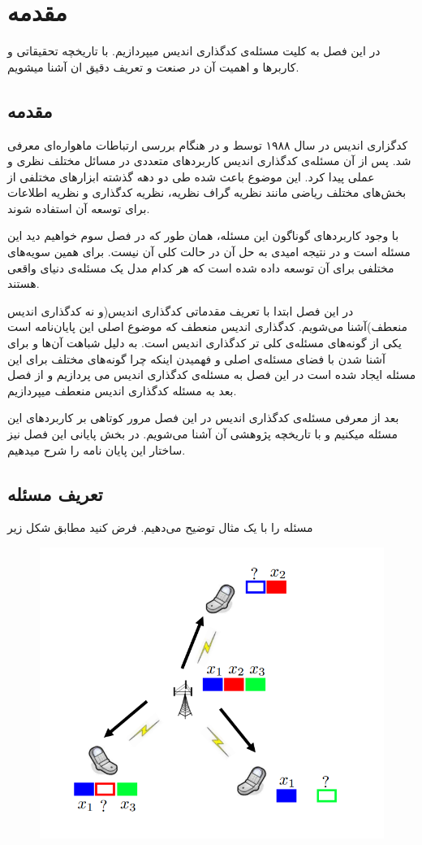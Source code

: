 \chapter{مقدمه}
\label{chapter:introduction}

در این فصل به کلیت مسئله‌ی کدگذاری اندیس میپردازیم. با تاریخچه تحقیقاتی و کاربرها و اهمیت آن در صنعت و تعریف دقیق ان آشنا میشویم.
\pagebreak

\section{مقدمه}
کدگزاری اندیس در سال ۱۹۸۸ توسط 
و
در
\cite{25}
هنگام بررسی ارتباطات ماهواره‌ای معرفی شد.  پس از آن مسئله‌ی کدگذاری اندیس کاربردهای متعددی در مسائل مختلف نظری و عملی پیدا کرد. این موضوع باعث شده طی دو دهه گذشته ابزارهای مختلفی از بخش‌های مختلف ریاضی مانند نظریه گراف نظریه، نظریه کدگذاری و نظریه اطلاعات برای توسعه آن استفاده شوند.

	با وجود کاربردهای گوناگون این مسئله، همان طور که در فصل سوم خواهیم دید این مسئله
است و در نتیجه امیدی به حل آن در حالت کلی آن نیست. برای همین سویه‌های مختلفی برای آن توسعه داده شده است که هر کدام مدل یک مسئله‌ی دنیای واقعی هستند.

در این فصل ابتدا با تعریف مقدماتی کدگذاری اندیس(و نه کدگذاری اندیس منعطف)آشنا می‌شویم. کدگذاری اندیس منعطف که موضوع اصلی این پایان‌نامه است یکی از گونه‌های مسئله‌ی کلی تر کدگذاری اندیس است. به دلیل شباهت آن‌ها و برای آشنا شدن با فضای مسئله‌ی اصلی و فهمیدن اینکه چرا گونه‌های مختلف برای این مسئله ایجاد شده است در این فصل به مسئله‌ی کدگذاری اندیس می پردازیم و از فصل بعد به مسئله کدگذاری اندیس منعطف میپردازیم.

 بعد از معرفی مسئله‌ی کدگذاری اندیس در این فصل مرور کوتاهی بر کاربردهای این مسئله میکنیم و با تاریخچه پژوهشی آن آشنا می‌شویم. در بخش پایانی این فصل نیز ساختار این پایان نامه را شرح میدهیم.

\section{تعریف مسئله}
مسئله را با یک مثال توضیح می‌دهیم.
فرض کنید مطابق شکل زیر
\begin{figure}[H]
	\centering
	\includegraphics[width=0.7\linewidth]{figs/chapter1/fatemeh1}
	\caption{\cite{Arbabjolfaei2018FundamentalsOI}}
	\label{fig:fatemeh1}
\end{figure}

